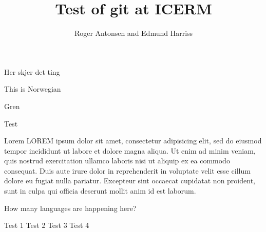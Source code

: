 \documentclass[12pt,a4paper]{article}
\author{Roger Antonsen and Edmund Harriss}
\title{Test of git at ICERM}
\begin{document}
\maketitle

Her skjer det ting

This is Norwegian

Gren

Test

Lorem LOREM ipsum dolor sit amet, consectetur adipisicing elit, sed do eiusmod tempor incididunt ut labore et dolore magna aliqua. Ut enim ad minim veniam, quis nostrud exercitation ullamco laboris nisi ut aliquip ex ea commodo consequat. Duis aute irure dolor in reprehenderit in voluptate velit esse cillum dolore eu fugiat nulla pariatur. Excepteur sint occaecat cupidatat non proident, sunt in culpa qui officia deserunt mollit anim id est laborum.

How many languages are happening here?

Test 1
Test 2
Test 3
Test 4
\end{document}
